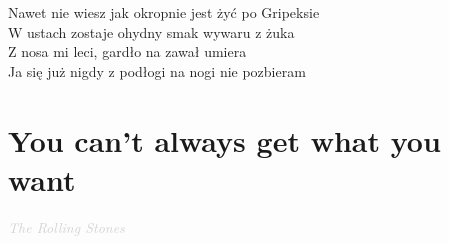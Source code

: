 \documentclass[a5paper, 10pt]{book}
\begin{document}
\begin{minipage}[t]{0.85\textwidth}
  \hspace*{6mm}Nawet nie wiesz jak okropnie jest żyć po Gripeksie       \\
  \hspace*{6mm}W ustach zostaje ohydny smak wywaru z żuka           \\
  \hspace*{6mm}Z nosa mi leci, gardło na zawał umiera                 \\
  \hspace*{6mm}Ja się już nigdy z podłogi na nogi nie pozbieram \\

\end{minipage}



\newpage
\section{You can't always get what you want}\textcolor{lightgray}{\textit{The Rolling Stones}}\\~\\
\end{document}
